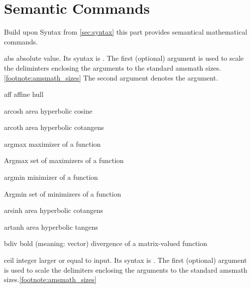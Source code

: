 \documentclass[english,a4paper,DIV=12,parskip=full,oneside]{scrartcl}
\begin{document}
    \section{Semantic Commands}
        \label{sec:semantic}
        Build upon Syntax from \cref{sec:syntax} this part provides semantical mathematical commands.

    \begin{commandlist}
        \item[abs] absolute value.
            Its syntax is .
            The first (optional) argument is used to scale the deliminters enclosing the arguments to the standard amsmath sizes.\cref{footnote:amsmath_sizes}
            The second argument denotes the argument.
            \par{}
            \par{}
            \par{}
        \item[aff] affine hull \mathCodeExample{\aff}
        \item[arcosh] area hyperbolic cosine \mathCodeExample{\arcosh}
        \item[arcoth] area hyperbolic cotangens \mathCodeExample{\arcoth}
        \item[argmax] maximizer of a function
        \item[Argmax] set of maximizers of a function
        \item[argmin] minimizer of a function
        \item[Argmin] set of minimizers of a function
        \item[arsinh] area hyperbolic cotangens \mathCodeExample{\arsinh}
        \item[artanh] area hyperbolic tangens \mathCodeExample{\artanh}
        \item[bdiv] bold (meaning: vector) divergence of a matrix-valued function \mathCodeExample{\bdiv}
        \item[ceil] integer larger or equal to input.
            Its syntax is .
            The first (optional) argument is used to scale the delimiters enclosing the arguments to the standard amsmath sizes.\cref{footnote:amsmath_sizes}

\end{commandlist}
\end{document}
